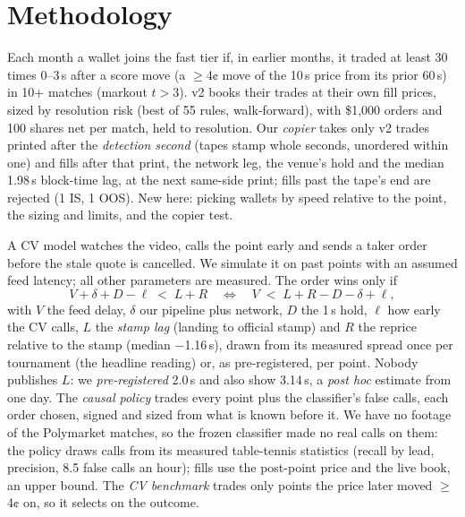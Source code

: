 \documentclass[11pt,letterpaper]{article}
\begin{document}
\section{Methodology}\label{sec:method}
 Each month a wallet joins the fast tier if, in earlier months, it traded at least
30 times 0--3\,s after a score move (a \(\geq\)4¢ move of the 10\,s price
from its prior 60\,s) in 10+ matches (markout \(t > 3\)).
v2 books their trades at their own fill prices, sized by resolution risk (best of 55 rules,
walk-forward), with \$1,000 orders and 100 shares net per match, held to resolution. Our
\emph{copier} takes only v2 trades printed after the \emph{detection second} (tapes stamp whole seconds, unordered within
one) and fills after that print, the network leg, the venue's hold and the median 1.98\,s block-time lag,
at the next same-side print; fills past the tape's end are rejected (1 IS,
1 OOS). New here: picking wallets by speed relative to the point, the sizing and limits,
and the copier test.

 A CV model watches the video, calls the point early and sends a taker order before the stale
quote is cancelled. We simulate it on past points with an assumed feed latency; all
other parameters are measured. The order wins only if
\begin{equation}\label{eq:budget}
  V + \delta + D - \ell \;<\; L + R \quad\Longleftrightarrow\quad V \;<\; L + R - D - \delta + \ell ,
\end{equation}
with \(V\) the feed delay, \(\delta\) our pipeline plus network, \(D\) the 1\,s hold, \(\ell\) how
early the CV calls, \(L\) the \emph{stamp lag} (landing to official stamp) and \(R\) the reprice relative to the stamp
(median −1.16\,s), drawn from its measured spread once per tournament (the headline
reading) or, as pre-registered, per point. Nobody publishes \(L\): we \emph{pre-registered}
2.0\,s and also show 3.14\,s, a \emph{post hoc} estimate from one day. The
\emph{causal policy} trades every point plus the classifier's false calls, each order chosen, signed and sized from
what is known before it. We have no footage of the Polymarket matches, so the frozen classifier made no real calls on
them: the policy draws calls from its measured table-tennis statistics (recall by lead, precision, 8.5 false
calls an hour); fills use the post-point price and the live book, an upper bound. The \emph{CV benchmark} trades only
points the price later moved \(\geq\)4¢ on, so it selects on the outcome.
\end{document}
